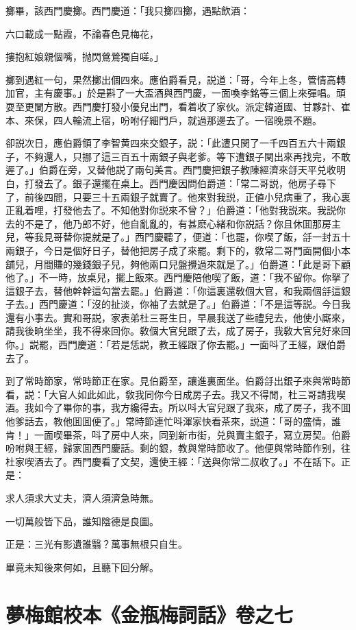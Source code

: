 擲畢，該西門慶擲。西門慶道：「我只擲四擲，遇點飲酒：

\begin{myquote}
六口載成一點霞，不論春色見梅花，

摟抱紅娘親個嘴，抛閃鶯鶯獨自嗟。」
\end{myquote}

擲到遇紅一句，果然擲出個四來。應伯爵看見，説道：「哥，今年上冬，管情高轉加官，主有慶事。」於是斟了一大盃酒與西門慶，一面喚李銘等三個上來彈唱。頑耍至更闌方散。西門慶打發小優兒出門，看着收了家伙。派定韓道國、甘夥計、崔本、來保，四人輪流上宿，吩咐仔細門戶，就過那邊去了。一宿晚景不題。

卻説次日，應伯爵領了李智黄四來交銀子，説：「此遭只関了一千四百五六十兩銀子，不夠還人，只挪了這三百五十兩銀子與老爹。等下遭銀子関出來再找完，不敢遲了。」伯爵在旁，又替他説了兩句美言。西門慶把銀子教陳經濟來㧱天平兑收明白，打發去了。銀子還擺在桌上。西門慶因問伯爵道：「常二哥説，他房子尋下了，前後四間，只要三十五兩銀子就賣了。他來對我説，正値小兒病重了，我心裏正亂着哩，打發他去了。不知他對你説來不曾？」伯爵道：「他對我説來。我説你去的不是了，他乃郎不好，他自亂亂的，有甚麽心緒和你説話？你且休囬那房主兒，等我見哥替你提就是了。」西門慶聽了，便道：「也罷，你喫了飯，㧱一封五十兩銀子，今日是個好日子，替他把房子成了來罷。剩下的，敎常二哥門面開個小本舖兒，月間賺的幾錢銀子兒，夠他兩口兒盤攪過來就是了。」伯爵道：「此是哥下顧他了。」不一時，放桌兒，擺上飯來。西門慶陪他喫了飯，道：「我不留你。你拏了這銀子去，替他幹幹這勾當去罷。」伯爵道：「你這裏還敎個大官，和我兩個㧱這銀子去。」西門慶道：「沒的扯淡，你袖了去就是了。」伯爵道：「不是這等説。今日我還有小事去。實和哥説，家表弟杜三哥生日，早晨我送了些禮兒去，他使小廝來，請我後晌坐坐，我不得來回你。敎個大官兒跟了去，成了房子，我敎大官兒好來回你。」説罷，西門慶道：「若是恁説，教王經跟了你去罷。」一面呌了王經，跟伯爵去了。

到了常時節家，常時節正在家。見伯爵至，讓進裏面坐。伯爵㧱出銀子來與常時節看，説：「大官人如此如此，敎我同你今日成房子去。我又不得閒，杜三哥請我喫酒。我如今了畢你的事，我方纔得去。所以呌大官兒跟了我來，成了房子，我不囬他爹話去，教他囬囬便了。」常時節連忙呌渾家快看茶來，説道：「哥的盛情，誰肯！」一面喫畢茶，呌了房中人來，同到新市街，兑與賣主銀子，寫立房契。伯爵吩咐與王經，歸家囬西門慶話。剩的銀，教與常時節收了。他便與常時節作别，往杜家喫酒去了。西門慶看了文契，還使王經：「送與你常二叔收了。」不在話下。正是：

\begin{myquote}
求人須求大丈夫，濟人須濟急時無。

一切萬般皆下品，誰知陰德是良圖。
\end{myquote}

正是：三光有影遺誰翳？萬事無根只自生。

畢竟未知後來何如，且聽下回分解。

\part*{夢梅館校本《金瓶梅詞話》卷之七}

